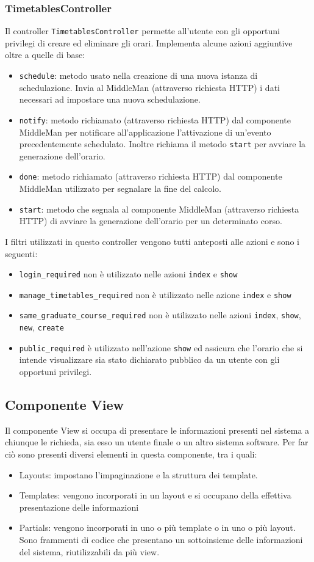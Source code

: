 \documentclass[11pt,a4paper]{article}
\begin{document}
\subsubsection{TimetablesController}
Il controller \verb|TimetablesController| permette all'utente con gli opportuni privilegi di creare ed eliminare gli orari.
Implementa alcune azioni aggiuntive oltre a quelle di base:
\begin{itemize}
\item \verb|schedule|: metodo usato nella creazione di una nuova istanza di schedulazione. Invia al MiddleMan (attraverso richiesta HTTP) i dati necessari ad impostare una nuova schedulazione.
\item \verb|notify|: metodo richiamato (attraverso richiesta HTTP) dal componente MiddleMan per notificare all'applicazione l'attivazione di un'evento precedentemente schedulato. Inoltre richiama il metodo \verb|start| per avviare la generazione dell'orario.
\item \verb|done|: metodo richiamato (attraverso richiesta HTTP) dal componente MiddleMan utilizzato per segnalare la fine del calcolo.
\item \verb|start|: metodo che segnala al componente MiddleMan (attraverso richiesta HTTP) di avviare la generazione dell'orario per un determinato corso.
\end{itemize}
I filtri utilizzati in questo controller vengono tutti anteposti alle azioni e sono i seguenti:
\begin{itemize}
 \item \verb|login_required| non è utilizzato nelle azioni \verb|index| e \verb|show|
 \item \verb|manage_timetables_required| non è utilizzato nelle azione \verb|index| e \verb|show|
 \item \verb|same_graduate_course_required| non è utilizzato nelle azioni \verb|index|, \verb|show|, \verb|new|, \verb|create|
 \item \verb|public_required| è utilizzato nell'azione \verb|show| ed assicura che l'orario che si intende visualizzare sia stato dichiarato pubblico da un utente con gli opportuni privilegi.
\end{itemize}
\subsection{Componente View}
Il componente View si occupa di presentare le informazioni presenti nel sistema a chiunque le richieda, sia esso un utente finale o un altro sistema software. Per far ciò sono presenti diversi elementi in questa componente, tra i quali:
\begin{itemize}
 \item Layouts: impostano l'impaginazione e la struttura dei template.
 \item Templates: vengono incorporati in un layout e si occupano della effettiva presentazione delle informazioni
 \item Partials: vengono incorporati in uno o più template o in uno o più layout. Sono frammenti di codice che presentano un sottoinsieme delle informazioni del sistema, riutilizzabili da più view.
\end{itemize}
\end{document}
